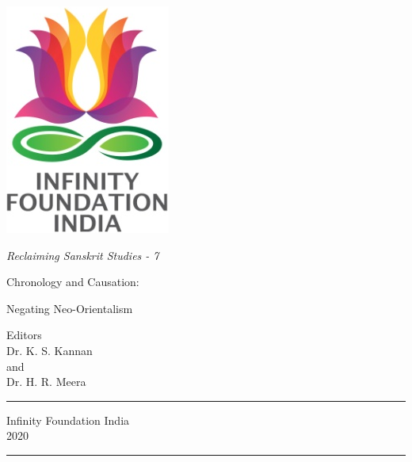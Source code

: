 \thispagestyle{empty}
\begin{center}
\includegraphics[scale=0.3]{images/logo.png}
\bigskip

{\fontsize{10}{14}\selectfont\sl
Reclaiming Sanskrit Studies - 7
}

\bigskip
\end{center}
\medskip

\begin{center}
{{\fontsize{20}{24}\selectfont Chronology and Causation:}}

{{\fontsize{20}{24}\selectfont Negating Neo-Orientalism}}

\vfill


\bigskip
\bigskip

{\fontsize{14}{18}\selectfont 
Editors\\[3pt]
Dr. K. S. Kannan\\
and\\[3pt]
Dr. H. R. Meera}\par
\vfill

\rule{5cm}{1pt}

{\fontsize{12}{14}\selectfont
Infinity Foundation India\\[4pt]
2020}

\rule{5cm}{1pt}
\end{center}




